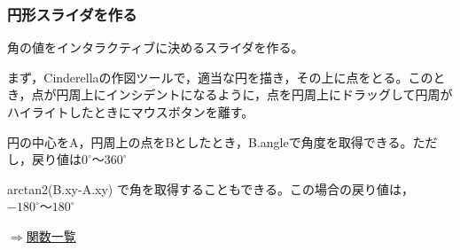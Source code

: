 \documentclass[papersize,a4paper,12pt,uplatex]{jsarticle}
\begin{document}
\subsubsection{円形スライダを作る}
角の値をインタラクティブに決めるスライダを作る。

まず，Cinderellaの作図ツールで，適当な円を描き，その上に点をとる。このとき，点が円周上にインシデントになるように，点を円周上にドラッグして円周がハイライトしたときにマウスボタンを離す。

円の中心をA，円周上の点をBとしたとき，B.angleで角度を取得できる。ただし，戻り値は$0^\circ 〜 360^\circ$ 

arctan2(B.xy-A.xy) で角を取得することもできる。この場合の戻り値は，$-180^\circ 〜 180^\circ$\\
\begin{flushright} \hyperlink{functionlist3d}{$\Rightarrow$関数一覧}\end{flushright}



\hypertarget{functionlist}{}
\end{document}
